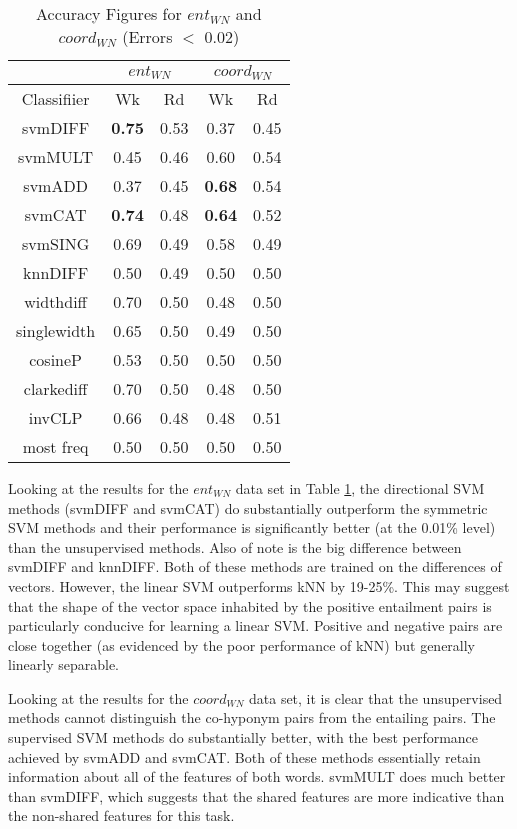 \documentclass[11pt]{article}
\begin{document}
\begin{table}[ht]
\centering
\begin{tabular}{|c|c|c|c|c|}
\hline
&\multicolumn{2}{|c|}{$ent_{WN}$}&\multicolumn{2}{|c|}{$coord_{WN}$}\\
\hline
Classifiier&Wk&Rd&Wk&Rd\\
\hline
svmDIFF&\textbf{0.75}&0.53&0.37&0.45\\
svmMULT&0.45&0.46&0.60&0.54\\
svmADD&0.37&0.45&\textbf{0.68}&0.54\\
svmCAT&\textbf{0.74}&0.48&\textbf{0.64}&0.52\\
svmSING&0.69&0.49&0.58&0.49\\
knnDIFF&0.50&0.49&0.50&0.50\\
\hline
widthdiff&0.70&0.50&0.48&0.50\\
singlewidth&0.65&0.50&0.49&0.50\\
cosineP&0.53&0.50&0.50&0.50\\
clarkediff&0.70&0.50&0.48&0.50\\
invCLP&0.66&0.48&0.48&0.51\\
most freq&0.50&0.50&0.50&0.50\\
\hline
\end{tabular}
\caption{Accuracy Figures for $ent_{WN}$ and $coord_{WN}$ (Errors $<$ 0.02)}
\label{table:results_WN}
\end{table}

Looking at the results for the $ent_{WN}$ data set in Table \ref{table:results_WN}, the directional SVM methods (svmDIFF and svmCAT) do substantially outperform the symmetric SVM methods and their performance is significantly better (at the 0.01\% level) than the unsupervised methods.  Also of note is the big difference between svmDIFF and knnDIFF.  Both of these methods are trained on the differences of vectors.  However, the linear SVM outperforms kNN by 19-25\%.  This may suggest that the shape of the vector space inhabited by the positive entailment pairs is particularly conducive for learning a linear SVM.  Positive and negative pairs are close together (as evidenced by the poor performance of kNN) but generally linearly separable.

Looking at the results for the $coord_{WN}$ data set, it is clear that the unsupervised methods cannot distinguish the co-hyponym pairs from the entailing pairs.  The supervised SVM methods do substantially better, with the best performance achieved by svmADD and svmCAT.  Both of these methods essentially retain information about all of the features of both words.  svmMULT does much better than svmDIFF, which suggests that the shared features are more indicative than the non-shared features for this task. 
\end{document}
